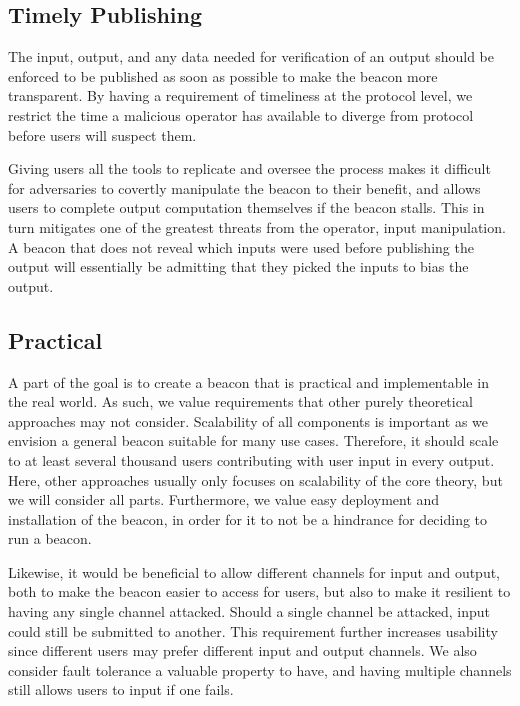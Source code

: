 \subsection{Timely Publishing}
The input, output, and any data needed for verification of an output should be enforced to be published as soon as possible to make the beacon more transparent.
By having a requirement of timeliness at the protocol level, we restrict the time a malicious operator has available to diverge from protocol before users will suspect them.

Giving users all the tools to replicate and oversee the process makes it difficult for adversaries to covertly manipulate the beacon to their benefit, and allows users to complete output computation themselves if the beacon stalls.
This in turn mitigates one of the greatest threats from the operator, input manipulation.
A beacon that does not reveal which inputs were used before publishing the output will essentially be admitting that they picked the inputs to bias the output.

\subsection{Practical}
A part of the goal is to create a beacon that is practical and implementable in the real world.
As such, we value requirements that other purely theoretical approaches may not consider.
Scalability of all components is important as we envision a general beacon suitable for many use cases.
Therefore, it should scale to at least several thousand users contributing with user input in every output.
Here, other approaches usually only focuses on scalability of the core theory, but we will consider all parts.
Furthermore, we value easy deployment and installation of the beacon, in order for it to not be a hindrance for deciding to run a beacon.

Likewise, it would be beneficial to allow different channels for input and output, both to make the beacon easier to access for users, but also to make it resilient to having any single channel attacked.
Should a single channel be attacked, input could still be submitted to another.
This requirement further increases usability since different users may prefer different input and output channels.
We also consider fault tolerance a valuable property to have, and having multiple channels still allows users to input if one fails.

